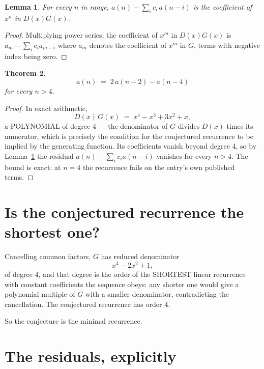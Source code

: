 \documentclass[11pt,a4paper]{article}
\theoremstyle{plain}
\newtheorem{theorem}{Theorem}
\newtheorem{lemma}[theorem]{Lemma}
\theoremstyle{definition}
\begin{document}
\begin{lemma}\label{lem:key}
For every $n$ in range, $a(n)-\sum_i c_i\,a(n-i)$ is the coefficient of $x^{n}$ in
$D(x)G(x)$.
\end{lemma}

\begin{proof}
Multiplying power series, the coefficient of $x^{m}$ in $D(x)G(x)$ is
$a_m-\sum_i c_i a_{m-i}$ where $a_m$ denotes the coefficient of $x^{m}$ in $G$, terms with
negative index being zero.
\end{proof}

\begin{theorem}
\[
a(n)\;=\;2\,a(n-2) - a(n-4)
\]
for every $n>4$.
\end{theorem}

\begin{proof}
In exact arithmetic,
\[
D(x)\,G(x)\;=\;x^{4} - x^{3} + 3 x^{2} + x,
\]
a POLYNOMIAL of degree $4$ --- the denominator of $G$ divides $D(x)$ times its numerator,
which is precisely the condition for the conjectured recurrence to be implied by the
generating function. Its coefficients vanish beyond degree $4$, so by
Lemma~\ref{lem:key} the residual $a(n)-\sum_ic_ia(n-i)$ vanishes for every
$n>4$. The bound is exact: at $n=4$ the recurrence fails on the entry's own published terms.
\end{proof}

\section{Is the conjectured recurrence the shortest one?}

Cancelling common factors, $G$ has reduced denominator
\[
x^{4} - 2 x^{2} + 1,
\]
of degree $4$, and that degree is the order of the SHORTEST linear recurrence with
constant coefficients the sequence obeys: any shorter one would give a polynomial multiple of
$G$ with a smaller denominator, contradicting the cancellation. The conjectured recurrence has
order $4$.

So the conjecture is the minimal recurrence.

\section{The residuals, explicitly}
\end{document}
